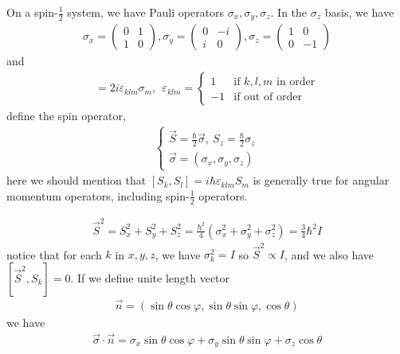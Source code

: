\documentclass[UTF8,12pt]{article} %
\begin{document}
On a spin-$\frac{1}{2}$ system, we have Pauli operators $\sigma_{x}, \sigma_{y}, \sigma_{z}$. In the $\sigma_{z}$ basis, we have
\begin{align}
\sigma_{x} = \begin{pmatrix}0&1\\1&0\end{pmatrix}, \sigma_{y} = \begin{pmatrix}0&-i\\i&0\end{pmatrix}, \sigma_{z} = \begin{pmatrix}1&0\\0&-1\end{pmatrix}
\end{align}
and
\begin{align}
[\sigma_{k}, \sigma_{l}] = 2i\varepsilon_{klm}\sigma_{m}, ~~\varepsilon_{klm} = \begin{cases}1 &\text{if } k,l,m \text{ in order}\\-1 &\text{if out of order}\end{cases}
\end{align}
define the spin operator,
\begin{align}
\begin{cases}
\vec{S} = \frac{\hbar}{2}\vec{\sigma},~ S_{z} = \frac{\hbar}{2}\sigma_{z}\\
\vec{\sigma} = (\sigma_{x}, \sigma_{y}, \sigma_{z})
\end{cases}
\end{align}
here we should mention that $\boxed{[S_{k}, S_{l}] = i\hbar\varepsilon_{klm}S_{m}}$ is generally true for angular momentum operators, including spin-$\frac{1}{2}$ operators.

\begin{align}
\vec{S}^{2} = S_{x}^{2} + S_{y}^{2} + S_{z}^{2} = \frac{\hbar^{2}}{4} \left(\sigma_{x}^{2} + \sigma_{y}^{2} + \sigma_{z}^{2}\right) = \frac{3}{4} \hbar^{2} I
\end{align}
notice that for each $k$ in $x, y, z$, we have $\boxed{\sigma_{k}^{2} = I}$ so $\vec{S}^{2} \propto I$, and we also have $\boxed{[\vec{S}^{2}, S_{k}] = 0}$. If we define unite length vector
\begin{align}
\vec{n} = (\sin\theta\cos\varphi, \sin\theta\sin\varphi, \cos\theta)
\end{align}
we have
\begin{align}
\vec{\sigma}\cdot\vec{n} = \sigma_{x}\sin\theta\cos\varphi + \sigma_{y}\sin\theta\sin\varphi + \sigma_{z}\cos\theta
\end{align}
\end{document}
